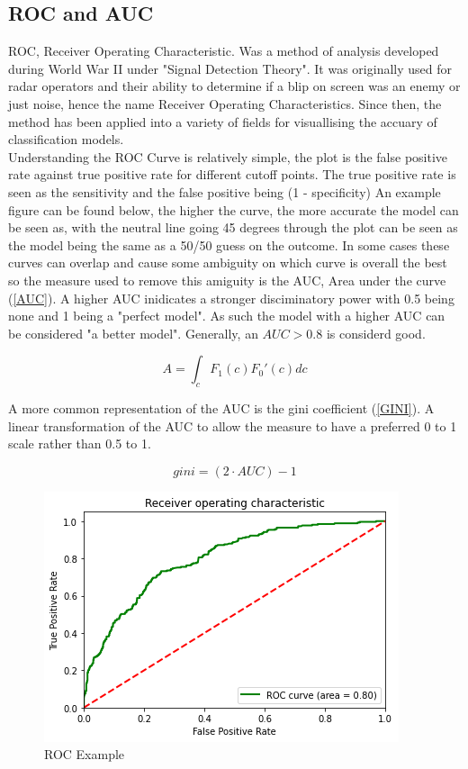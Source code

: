 \subsection*{ROC and AUC}
ROC, Receiver Operating Characteristic. Was a method of analysis developed during World War II under "Signal Detection Theory". It was originally used for radar operators and their ability to determine if a blip on screen was an enemy or just noise, hence the name Receiver Operating Characteristics.\cite{tape2000using} Since then, the method has been applied into a variety of fields for visuallising the accuary of classification models. \\

Understanding the ROC Curve is relatively simple, the plot is the false positive rate against true positive rate for different cutoff points. The true positive rate is seen as the sensitivity and the false positive being (1 - specificity) An example figure can be found below, the higher the curve, the more accurate the model can be seen as, with the neutral line going 45 degrees through the plot can be seen as the model being the same as a 50/50 guess on the outcome. In some cases these curves can overlap and cause some ambiguity on which curve is overall the best so the measure used to remove this amiguity is the AUC, Area under the curve (\ref{AUC}). A higher AUC inidicates a stronger disciminatory power with 0.5 being none and 1 being a "perfect model". As such the model with a higher AUC can be considered "a better model". Generally, an $AUC > 0.8$ is considerd good.

\begin{equation}\label{AUC}
A = \int_{c}^{} F_1(c){F_0}'(c) dc
\end{equation}

A more common representation of the AUC is the gini coefficient (\ref{GINI}). A linear transformation of the AUC to allow the measure to have a preferred 0 to 1 scale rather than 0.5 to 1.

\begin{equation}\label{GINI}
gini = (2 \cdot AUC) - 1
\end{equation}

\begin{figure}[!ht]
	\centering
	\includegraphics[scale=1.00]{figs/roc_example.png}
	\caption{ROC Example \label{roc_example}}
\end{figure}

